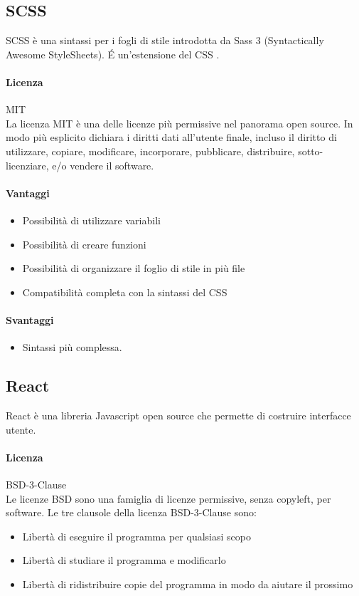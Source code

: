 \subsection{SCSS}

SCSS è una sintassi per i fogli di stile introdotta da Sass 3 (Syntactically Awesome StyleSheets). \'E un'estensione del CSS .

\paragraph{Licenza} MIT \\
La licenza MIT è una delle licenze più permissive nel panorama open
source. In modo più esplicito dichiara i diritti dati all'utente
finale, incluso il diritto di utilizzare, copiare, modificare,
incorporare, pubblicare, distribuire, sotto-licenziare, e/o vendere il
software. 

\paragraph{Vantaggi}
\begin{itemize}
	\item Possibilità di utilizzare variabili
	\item Possibilità di creare funzioni 
	\item Possibilità di organizzare il foglio di stile in più file
	\item Compatibilità completa con la sintassi del CSS
\end{itemize}

\paragraph{Svantaggi} 
\begin{itemize}
	\item  Sintassi più complessa.
\end{itemize}

\subsection{React}

React è una libreria Javascript open source che permette di costruire interfacce utente. 
\\
\paragraph{Licenza} BSD-3-Clause \\
Le licenze BSD sono una famiglia di licenze permissive, senza copyleft, per software.
Le tre clausole della licenza BSD-3-Clause sono:
\\
\begin{itemize}
	\item Libertà di eseguire il programma per qualsiasi scopo
	\item Libertà di studiare il programma e modificarlo
	\item Libertà di ridistribuire copie del programma in modo da aiutare il prossimo
	
\end{itemize}

